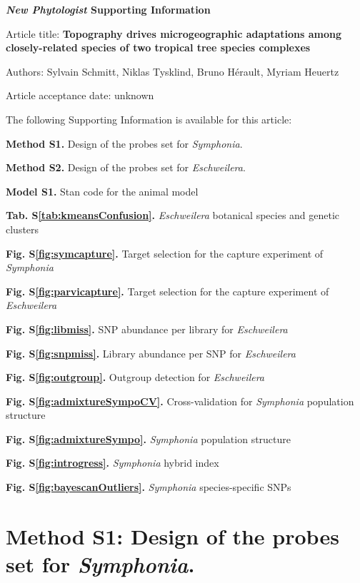 \documentclass[12pt,]{article}
\begin{document}
\textbf{\emph{New Phytologist} Supporting Information}

Article title: \textbf{Topography drives microgeographic adaptations among closely-related species of two tropical tree species complexes}

Authors: Sylvain Schmitt, Niklas Tysklind, Bruno Hérault, Myriam Heuertz

Article acceptance date: unknown

The following Supporting Information is available for this article:

\textbf{Method S1.} Design of the probes set for \emph{Symphonia}.

\textbf{Method S2.} Design of the probes set for \emph{Eschweilera}.

\textbf{Model S1.} Stan code for the animal model

\textbf{Tab. S\ref{tab:kmeansConfusion}.} \emph{Eschweilera} botanical species and genetic clusters

\textbf{Fig. S\ref{fig:symcapture}.} Target selection for the capture experiment of \emph{Symphonia}

\textbf{Fig. S\ref{fig:parvicapture}.} Target selection for the capture experiment of \emph{Eschweilera}

\textbf{Fig. S\ref{fig:libmiss}.} SNP abundance per library for \emph{Eschweilera}

\textbf{Fig. S\ref{fig:snpmiss}.} Library abundance per SNP for \emph{Eschweilera}

\textbf{Fig. S\ref{fig:outgroup}.} Outgroup detection for \emph{Eschweilera}

\textbf{Fig. S\ref{fig:admixtureSympoCV}.} Cross-validation for \emph{Symphonia} population structure

\textbf{Fig. S\ref{fig:admixtureSympo}.} \emph{Symphonia} population structure

\textbf{Fig. S\ref{fig:introgress}.} \emph{Symphonia} hybrid index

\textbf{Fig. S\ref{fig:bayescanOutliers}.} \emph{Symphonia} species-specific SNPs

\newpage

\hypertarget{method-s1-design-of-the-probes-set-for-symphonia.}{%
\section{\texorpdfstring{Method S1: Design of the probes set for \emph{Symphonia}.}{Method S1: Design of the probes set for Symphonia.}}\label{method-s1-design-of-the-probes-set-for-symphonia.}}
\end{document}
